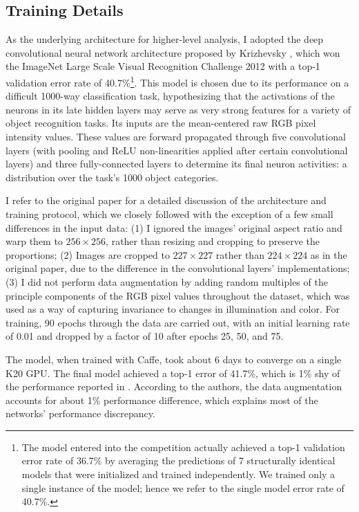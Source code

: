 \subsection{Training Details}
As the underlying architecture for higher-level analysis, I adopted the deep convolutional neural network architecture proposed by Krizhevsky \etal \cite{krizhevsky2012imagenet}, which won the ImageNet Large Scale Visual Recognition Challenge 2012 with a top-1 validation error rate of 40.7\%\footnote{The model entered into the competition actually achieved a
top-1 validation error rate of 36.7\% by averaging the predictions
of 7 structurally identical models that were initialized and trained
independently. We trained only a single instance of the model;
hence we refer to the single model error rate of 40.7\%.
}. This model is chosen due to its performance on a difficult 1000-way classification task, hypothesizing that the activations of the neurons in its late hidden layers may serve as very strong features for a variety of object recognition tasks. Its inputs are the mean-centered raw RGB pixel intensity values. These values are forward propagated through five convolutional layers (with pooling and ReLU non-linearities applied after certain convolutional layers) and three fully-connected layers to determine its final neuron activities: a distribution over the task's 1000 object categories.

I refer to the original paper for a detailed discussion of the architecture and training protocol, which we closely followed with the exception of a few small differences in the input data: (1) I ignored the images' original aspect ratio and warp them to $256\times 256$, rather than resizing and cropping to preserve the proportions; (2) Images are cropped to $227\times 227$ rather than $224\times 224$ as in the original paper, due to the difference in the convolutional layers' implementations; (3) I did not perform data augmentation by adding random multiples of the principle components of the RGB pixel values throughout the dataset, which was used as a way of capturing invariance to changes in illumination and color. For training, 90 epochs through the data are carried out, with an initial learning rate of 0.01 and dropped by a factor of 10 after epochs 25, 50, and 75.

The model, when trained with Caffe, took about 6 days to converge on a single K20 GPU. The final model achieved a top-1 error of 41.7\%, which is 1\% shy of the performance reported in \cite{krizhevsky2012imagenet}. According to the authors, the data augmentation accounts for about 1\% performance difference, which explains most of the networks' performance discrepancy.

